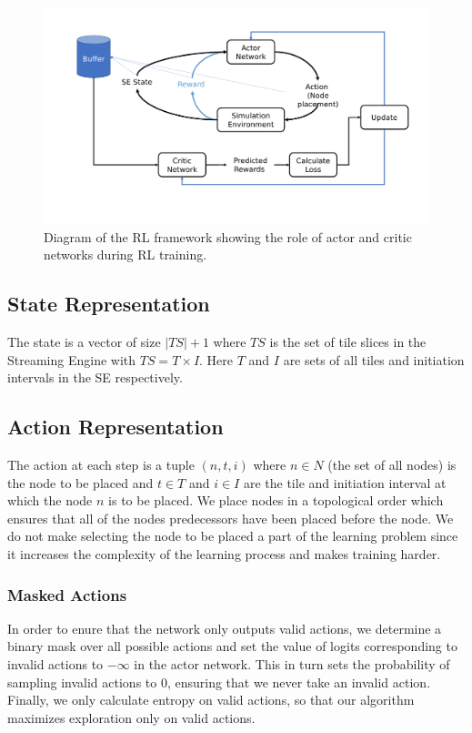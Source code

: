 \begin{figure}[h]
  \centering
  \includegraphics[width=\linewidth]{fig/ppo.pdf}
  \caption{Diagram of the RL framework showing the role of actor and critic networks during RL training. }
  \label{fig:ppo}
\end{figure}

\subsection{State Representation}
The state is a vector of size $|TS|+1$ where $TS$ is the set of tile slices in the Streaming Engine with $TS=T \times I$. Here $T$ and $I$ are sets of all tiles and initiation intervals in the SE respectively.

\subsection{Action Representation}
The action at each step is a tuple \((n,t,i)\) where $n \in N$ (the set of all nodes) is the node to be placed and $t \in T$ and $i \in I$ are the tile and initiation interval at which the node $n$ is to be placed. We place nodes in a topological order which ensures that all of the nodes predecessors have been placed before the node. We do not make selecting the node to be placed a part of the learning problem since it increases the complexity of the learning process and makes training harder.

\subsubsection{Masked Actions}
In order to enure that the network only outputs valid actions, we determine a binary mask over all possible actions and set the value of logits corresponding to invalid actions to $-\infty$ in the actor network. 
This in turn sets the probability of sampling invalid actions to $0$, ensuring that we never take an invalid action.
Finally, we only calculate entropy on valid actions, so that our algorithm maximizes exploration only on valid actions.

